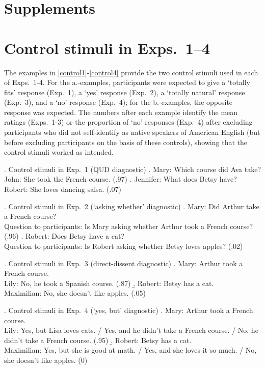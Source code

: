\documentclass[times,linguex]{glossa}
\begin{document}
\setcounter{ExNo}{0}


\section*{Supplements}

\section{Control stimuli in Exps.~1--4}\label{supp:stims}

The examples in \ref{control1}-\ref{control4} provide the two control stimuli used in each of Exps.~1-4. For the a.-examples, participants were expected to give a `totally fits' response (Exp.~1), a `yes' response (Exp.~2), a `totally natural' response (Exp.~3), and a `no' response (Exp.~4); for the b.-examples, the opposite response was expected. The numbers after each example identify the mean ratings (Exps.~1-3) or the proportion of `no' responses (Exp.~4) after excluding participants who did not self-identify as native speakers of American English (but before excluding participants on the basis of these controls), showing that the control stimuli worked as intended.

\ex.\label{control1} Control stimuli in Exp.~1 (QUD diagnostic)
\a. Mary: Which course did Ava take?
\\ John: She took the French course. (.97)
\b. Jennifer: What does Betsy have?
\\ Robert: She loves dancing salsa. (.07)

\ex.\label{control2} Control stimuli in Exp.~2 (`asking whether' diagnostic)
\a. Mary: Did Arthur take a French course?
\\ Question to participants: Is Mary asking whether Arthur took a French course? (.96)
\b. Robert: Does Betsy have a cat?
\\ Question to participants: Is Robert asking whether Betsy loves apples? (.02)

\ex.\label{control3} Control stimuli in Exp.~3 (direct-dissent diagnostic)
\a. Mary: Arthur took a French course.
\\ Lily: No, he took a Spanish course. (.87)
\b. Robert: Betsy has a cat.
\\ Maximilian: No, she doesn't like apples. (.05)

\ex.\label{control4} Control stimuli in Exp.~4 (`yes, but' diagnostic)
\a. Mary: Arthur took a French course.
\\ Lily: Yes, but Lisa loves cats. / Yes, and he didn't take a French course. / No, he didn't take a French course. (.95)
\b. Robert: Betsy has a cat.
\\ Maximilian: Yes, but she is good at math. / Yes, and she loves it so much. / No, she doesn't like apples. (0)
\end{document}
